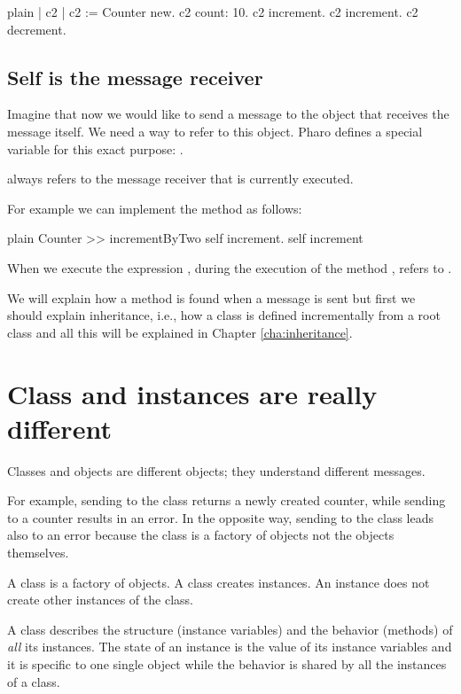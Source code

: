 \documentclass[10pt,twoside,english]{_support/latex/sbabook/sbabook}
\begin{document}
\begin{displaycode}{plain}
| c2 |
c2 := Counter new.
c2 count: 10.
c2 increment.
c2 increment.
c2 decrement.
\end{displaycode}
\subsection{Self is the message receiver}
Imagine that now we would like to send a message to the object that receives the message itself. We need a way to refer to this object. Pharo defines a special variable for this exact purpose: . 

\begin{important}
 always refers to the message receiver that is currently executed.
\end{important}

For example we can implement the method  as follows:

\begin{displaycode}{plain}
Counter >> incrementByTwo
	self increment. 
	self increment
\end{displaycode}

When we execute the expression , during the execution of the method ,  refers to . 

We will explain  how a method is found when a message is sent but first we should explain inheritance, i.e., how a class is defined incrementally from a root class and all this will be explained  in Chapter \ref{cha:inheritance}.
\section{Class and instances are really different}
Classes and objects are different objects; they understand different messages. 

For example, sending  to the  class returns a newly created counter, while sending  to a counter results in an error. In the opposite way, sending  to the class  leads also to an error because the class  is a factory of objects not the objects themselves. 

A class is a factory of objects. A class creates instances. An instance does not create other instances of the class.

\begin{coffee}
A class describes the structure (instance variables) and the behavior (methods) of \textit{all} its instances. The state of an instance is the value of its instance variables and it is specific to one single object while the behavior is shared by all the instances of a class.
\end{coffee}
\end{document}
